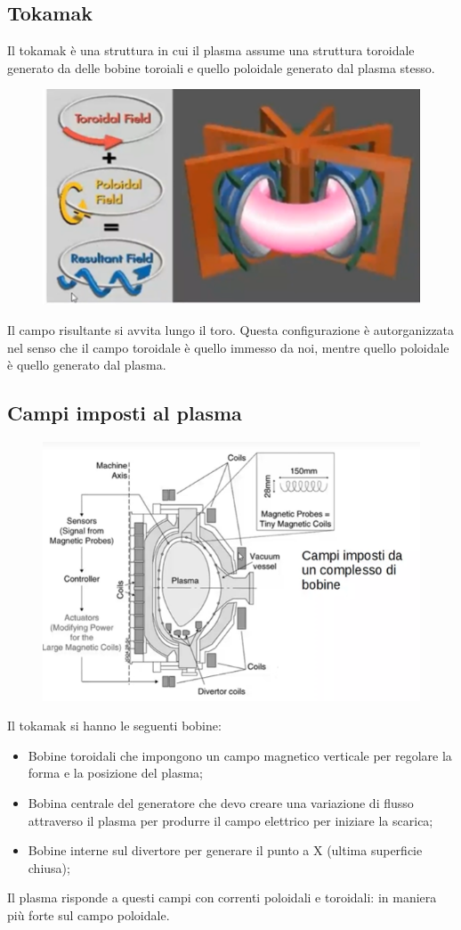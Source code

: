 \documentclass{article}
\begin{document}
\subsection{Tokamak}
Il tokamak è una struttura in cui il plasma assume una struttura toroidale generato da delle bobine toroiali e quello poloidale generato dal plasma stesso.
	\begin{figure}[h]
		\centering
		\includegraphics[scale=0.4]{2022-06-26-14-53-25.png}%
	\end{figure}
Il campo risultante si avvita lungo il toro. Questa configurazione è autorganizzata nel senso che il campo toroidale è quello immesso da noi, mentre quello poloidale è quello generato dal plasma.
\subsection{Campi imposti al plasma}
	\begin{figure}[h]
		\centering
		\includegraphics[scale=0.4]{2022-06-26-14-59-14.png}%
	\end{figure}
Il tokamak si hanno le seguenti bobine:
\begin{itemize}
	\item Bobine toroidali che impongono un campo magnetico verticale per regolare la forma e la posizione del plasma;
	\item Bobina centrale del generatore che devo creare una variazione di flusso attraverso il plasma per produrre il campo elettrico per iniziare la scarica;
	\item Bobine interne sul divertore per generare il punto a X (ultima superficie chiusa);
\end{itemize}
Il plasma risponde a questi campi con correnti poloidali e toroidali: in maniera più forte sul campo poloidale.
\end{document}
